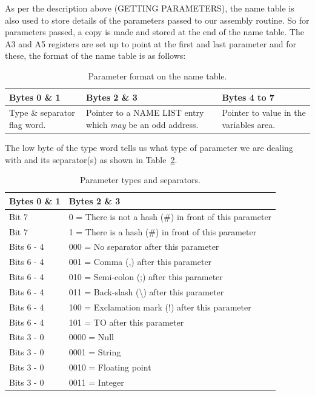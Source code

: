 As per the description above (GETTING PARAMETERS), the name table is
    also used to store details of the parameters passed to our assembly
    routine. So for parameters passed, a copy is made and stored at the end of
    the name table. The A3 and A5 registers are set up to point at the first
    and last parameter and for these, the format of the name table is as
    follows:
\begin{table}[htbp]
\centering
\begin{tabular}{p{}p{}p{}}\toprule
\textbf{Bytes 0 \& 1} & \textbf{Bytes 2 \& 3} & \textbf{Bytes 4 to 7} \\
\midrule
%
Type \& separator flag word. &
Pointer to a NAME LIST entry which \emph{may} be an odd address. &
Pointer to value in the variables area. \\
%
\bottomrule
\end{tabular}
\caption{Parameter format on the name table.}
\label{tab:NameTableParameterFormat}
\end{table}

The low byte of the type word tells us what type of parameter we are
    dealing with and its separator(s) as shown in Table~\ref{tab:ParameterTypesAndSeparators}.

\begin{table}[htbp]
\centering
\begin{tabular}{l l}  %
\toprule
\textbf{Bytes 0 \& 1} & \textbf{Bytes 2 \& 3} \\
\midrule
%
Bit 7 & 0 = There is not a hash (\#) in front of this parameter\\
Bit 7 & 1 = There is a hash (\#) in front of this parameter\\
Bits 6 -{} 4 & 000 = No separator after this parameter\\
Bits 6 -{} 4 & 001 = Comma (,) after this parameter\\
Bits 6 -{} 4 & 010 = Semi-{}colon (;) after this parameter\\
Bits 6 -{} 4 & 011 = Back-{}slash (\textbackslash{}) after this parameter\\
Bits 6 -{} 4 & 100 = Exclamation mark (!) after this parameter\\
Bits 6 -{} 4 & 101 = TO after this parameter\\
Bits 3 -{} 0 & 0000 = Null\\
Bits 3 -{} 0 & 0001 = String\\
Bits 3 -{} 0 & 0010 = Floating point\\
Bits 3 -{} 0 & 0011 = Integer\\
%
\bottomrule
\end{tabular}
\caption{Parameter types and separators.}
\label{tab:ParameterTypesAndSeparators}
\end{table}

